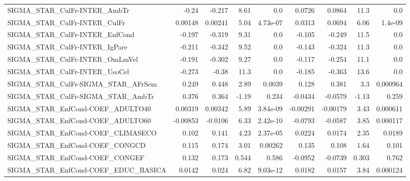 \begin{tabular}{lrrrrrrrr}
SIGMA\_STAR\_CulFr-INTER\_AmbTr          &       -0.24 &       -0.217 &    8.61 &      0.0 &     0.0726 &      0.0864 &         11.3 &           0.0 \\
SIGMA\_STAR\_CulFr-INTER\_CulFr          &     0.00148 &      0.00241 &    5.04 & 4.73e-07 &     0.0313 &      0.0694 &         6.06 &       1.4e-09 \\
SIGMA\_STAR\_CulFr-INTER\_EnfCond        &      -0.197 &       -0.319 &    9.31 &      0.0 &     -0.105 &      -0.249 &         11.5 &           0.0 \\
SIGMA\_STAR\_CulFr-INTER\_IgPare         &      -0.211 &       -0.342 &    9.52 &      0.0 &     -0.143 &      -0.324 &         11.3 &           0.0 \\
SIGMA\_STAR\_CulFr-INTER\_OmLmVel        &      -0.191 &       -0.302 &    9.27 &      0.0 &     -0.117 &      -0.254 &         11.1 &           0.0 \\
SIGMA\_STAR\_CulFr-INTER\_UsoCel         &      -0.273 &        -0.38 &    11.3 &      0.0 &     -0.185 &      -0.363 &         13.6 &           0.0 \\
SIGMA\_STAR\_CulFr-SIGMA\_STAR\_AFrSem    &       0.249 &        0.448 &    2.89 &   0.0039 &      0.128 &       0.381 &          3.3 &      0.000964 \\
SIGMA\_STAR\_CulFr-SIGMA\_STAR\_AmbTr     &       0.376 &        0.364 &   -1.19 &    0.234 &    -0.0434 &     -0.0579 &        -1.13 &         0.259 \\
SIGMA\_STAR\_EnfCond-COEF\_ADULTO40      &     0.00319 &      0.00342 &    5.89 & 3.84e-09 &   -0.00291 &    -0.00179 &         3.43 &      0.000611 \\
SIGMA\_STAR\_EnfCond-COEF\_ADULTO60      &    -0.00853 &      -0.0106 &    6.33 & 2.42e-10 &    -0.0793 &     -0.0587 &         3.85 &      0.000117 \\
SIGMA\_STAR\_EnfCond-COEF\_CLIMASECO     &       0.102 &        0.141 &    4.23 & 2.37e-05 &     0.0224 &      0.0174 &         2.35 &        0.0189 \\
SIGMA\_STAR\_EnfCond-COEF\_CONGCD        &       0.115 &        0.174 &    3.01 &  0.00262 &      0.135 &       0.108 &         1.64 &         0.101 \\
SIGMA\_STAR\_EnfCond-COEF\_CONGEF        &       0.132 &        0.173 &   0.544 &    0.586 &    -0.0952 &     -0.0739 &        0.303 &         0.762 \\
SIGMA\_STAR\_EnfCond-COEF\_EDUC\_BASICA   &      0.0142 &        0.024 &    6.82 & 9.03e-12 &     0.0182 &      0.0157 &         3.84 &      0.000124 \\

\end{tabular}
